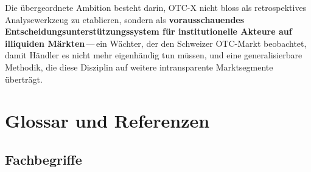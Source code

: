 \documentclass[11pt, a4paper, oneside, openany]{report}
\begin{document}
\begin{insightbox}
Die übergeordnete Ambition besteht darin, OTC-X nicht bloss als retrospektives Analysewerkzeug zu etablieren, sondern als \textbf{vorausschauendes Entscheidungsunterstützungssystem für institutionelle Akteure auf illiquiden Märkten}\,---\,ein Wächter, der den Schweizer OTC-Markt beobachtet, damit Händler es nicht mehr eigenhändig tun müssen, und eine generalisierbare Methodik, die diese Disziplin auf weitere intransparente Marktsegmente überträgt.
\end{insightbox}


\chapter{Glossar und Referenzen}
\label{ch:glossar}

\section{Fachbegriffe}
\end{document}
